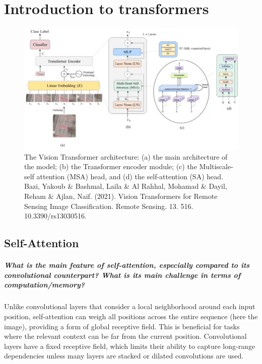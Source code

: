 \chapter{Introduction to transformers}
\begin{figure}[H]
    \centering
    \includegraphics*[width=.8\textwidth]{figs/Transformers/The-Vision-Transformer-architecture-a-the-main-architecture-of-the-model-b-the.png}
    \caption*{The Vision Transformer architecture: (a) the main architecture of the model; (b) the Transformer encoder module; (c) the Multiscale-self attention (MSA) head, and (d) the self-attention (SA) head.\\Bazi, Yakoub \& Bashmal, Laila \& Al Rahhal, Mohamad \& Dayil, Reham \& Ajlan, Naif. (2021). Vision Transformers for Remote Sensing Image Classification. Remote Sensing. 13. 516. 10.3390/rs13030516. }
\end{figure}

\section{Self-Attention}
\paragraph{What is the main feature of self-attention, especially compared to its convolutional counterpart? What is its main challenge in terms of computation/memory?}\label{paragraph:complexity}
Unlike convolutional layers that consider a local neighborhood around each input position, self-attention can weigh all positions across the entire sequence (here the image), providing a form of global receptive field. This is beneficial for tasks where the relevant context can be far from the current position. Convolutional layers have a fixed receptive field, which limits their ability to capture long-range dependencies unless many layers are stacked or dilated convolutions are used.

